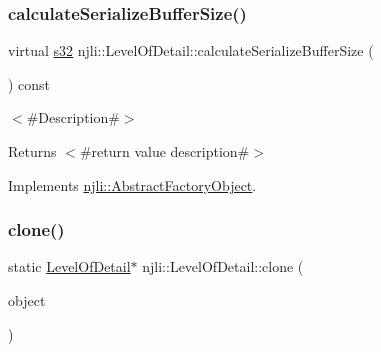 \mbox{\label{classnjli_1_1_level_of_detail_a497e9f0c1a6025bb7ac6cf06de6ee4a1}} 
\subsubsection{\texorpdfstring{calculate\+Serialize\+Buffer\+Size()}{calculateSerializeBufferSize()}}
{\footnotesize\ttfamily virtual \mbox{\hyperlink{_util_8h_aa62c75d314a0d1f37f79c4b73b2292e2}{s32}} njli\+::\+Level\+Of\+Detail\+::calculate\+Serialize\+Buffer\+Size (\begin{DoxyParamCaption}{ }\end{DoxyParamCaption}) const\hspace{0.3cm}{\ttfamily [virtual]}}

$<$\#\+Description\#$>$

\begin{DoxyReturn}{Returns}
$<$\#return value description\#$>$ 
\end{DoxyReturn}


Implements \mbox{\hyperlink{classnjli_1_1_abstract_factory_object_a4763d05bc9dc37c559111f8bb30e1dd8}{njli\+::\+Abstract\+Factory\+Object}}.

\mbox{\label{classnjli_1_1_level_of_detail_a4e157e2d27cb7e6f2194a8239673a735}} 
\subsubsection{\texorpdfstring{clone()}{clone()}}
{\footnotesize\ttfamily static \mbox{\hyperlink{classnjli_1_1_level_of_detail}{Level\+Of\+Detail}}$\ast$ njli\+::\+Level\+Of\+Detail\+::clone (\begin{DoxyParamCaption}\item[{const \mbox{\hyperlink{classnjli_1_1_level_of_detail}{Level\+Of\+Detail}} \&}]{object }\end{DoxyParamCaption})\hspace{0.3cm}{\ttfamily [static]}}

